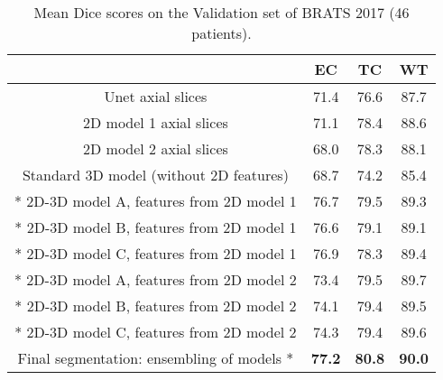 \documentclass[preprint,12pt]{elsarticle}
\begin{document}
\begin{table}[ht!]
\centering
\caption{Mean Dice scores on the Validation set of BRATS 2017 (46 patients).}
\begin{tabular}{|c|c|c|c|}
  \hline
& \scriptsize{EC}& \scriptsize{TC}& \scriptsize{WT}\\ 
\hline
\scriptsize{Unet axial slices}& \scriptsize{ 71.4   }& \scriptsize{ 76.6}& \scriptsize{ 87.7  }\\ 
  \hline
\scriptsize{2D model 1 axial slices}& \scriptsize{  71.1 }& \scriptsize{ 78.4}& \scriptsize{ 88.6  }\\ 
\hline
\scriptsize{2D model 2 axial slices}& \scriptsize{ 68.0 }& \scriptsize{ 78.3}& \scriptsize{ 88.1   }\\ 
  \hline
\scriptsize{Standard 3D model (without 2D features)}& \scriptsize{ 68.7 }& \scriptsize{ 74.2  }& \scriptsize{ 85.4  }\\ 
  \hline
\scriptsize{* 2D-3D model A, features from 2D model 1}& \scriptsize{ 76.7 }& \scriptsize{ 79.5 }& \scriptsize{ 89.3   }\\ 
  \hline
\scriptsize{* 2D-3D model B, features from 2D model 1}& \scriptsize{ 76.6 }& \scriptsize{ 79.1 }& \scriptsize{ 89.1  }\\ 
  \hline
\scriptsize{* 2D-3D model C, features from 2D model 1}& \scriptsize{ 76.9 }& \scriptsize{ 78.3 }& \scriptsize{ 89.4   }\\ 
  \hline
\scriptsize{*  2D-3D model A, features from 2D model 2}& \scriptsize{ 73.4 }& \scriptsize{ 79.5 }& \scriptsize{ 89.7  }\\ 
 \hline
\scriptsize{*  2D-3D model B, features from 2D model 2}& \scriptsize{ 74.1 }& \scriptsize{ 79.4 }& \scriptsize{ 89.5   }\\ 
  \hline
\scriptsize{* 2D-3D model C, features from 2D model 2}& \scriptsize{ 74.3 }& \scriptsize{ 79.4 }& \scriptsize{ 89.6 }\\ 
  \hline
\scriptsize{ Final segmentation: ensembling of models *}& \scriptsize{ \textbf{77.2} }& \scriptsize{ \textbf{80.8} }& \scriptsize{ \textbf{90.0}  }\\ 
  \hline

\end{tabular}
\label{table_results2}
\end{table}
\end{document}
